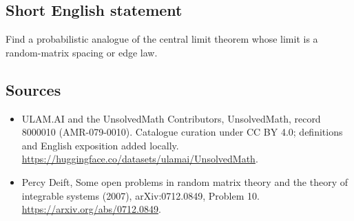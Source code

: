 \documentclass[11pt]{article}
\begin{document}
\subsection{Short English statement}
Find a probabilistic analogue of the central limit theorem whose limit is a random-matrix spacing or edge law.
\subsection{Sources}
\begin{itemize}
\item[\hypertarget{source:8000010:1}{S1}] ULAM.AI and the UnsolvedMath Contributors, UnsolvedMath, record 8000010 (AMR-079-0010). Catalogue curation under CC BY 4.0; definitions and English exposition added locally.
\url{https://huggingface.co/datasets/ulamai/UnsolvedMath}.
\item[\hypertarget{source:8000010:2}{S2}] Percy Deift, Some open problems in random matrix theory and the theory of integrable systems (2007), arXiv:0712.0849, Problem 10.
\url{https://arxiv.org/abs/0712.0849}.
\end{itemize}
\label{end:8000010}
\end{document}
